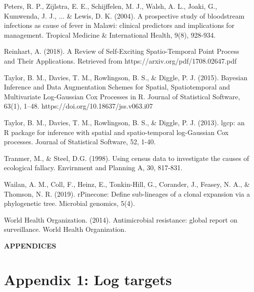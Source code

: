 \documentclass[12pt,a4paper]{report}
\begin{document}
\begin{thebibliography}{99}
	 Peters, R. P., Zijlstra, E. E., Schijffelen, M. J., Walsh, A. L., Joaki, G., Kumwenda, J. J., ... \& Lewis, D. K. (2004). A prospective study of bloodstream infections as cause of fever in Malawi: clinical predictors and implications for management. Tropical Medicine \& International Health, 9(8), 928-934.
	
	 Reinhart, A. (2018). A Review of Self-Exciting Spatio-Temporal Point Process and Their Applications. Retrieved from https://arxiv.org/pdf/1708.02647.pdf
	
	 Taylor, B. M., Davies, T. M., Rowlingson, B. S., \& Diggle, P. J. (2015). Bayesian Inference and Data Augmentation Schemes for Spatial, Spatiotemporal and Multivariate Log-Gaussian Cox Processes in R. Journal of Statistical Software, 63(1), 1–48. https://doi.org/10.18637/jss.v063.i07
	
	 Taylor, B. M., Davies, T. M., Rowlingson, B. S., \& Diggle, P. J. (2013). lgcp: an R package for inference with spatial and spatio-temporal log-Gaussian Cox processes. Journal of Statistical Software, 52, 1-40.
	
	 Tranmer, M., \& Steel, D.G. (1998). Using census data to investigate the causes of ecological fallacy. Envirnment and Planning A, 30, 817-831.
	
	 Wailan, A. M., Coll, F., Heinz, E., Tonkin-Hill, G., Corander, J., Feasey, N. A., \& Thomson, N. R. (2019). rPinecone: Define sub-lineages of a clonal expansion via a phylogenetic tree. Microbial genomics, 5(4).
	
	 World Health Organization. (2014). Antimicrobial resistance: global report on surveillance. World Health Organization.
	
\end{thebibliography}

\newpage
{}

\begin{huge}
	\begin{center}
		\bf{APPENDICES}
	\end{center}
\end{huge}


\section*{Appendix 1: Log targets}
\end{document}
